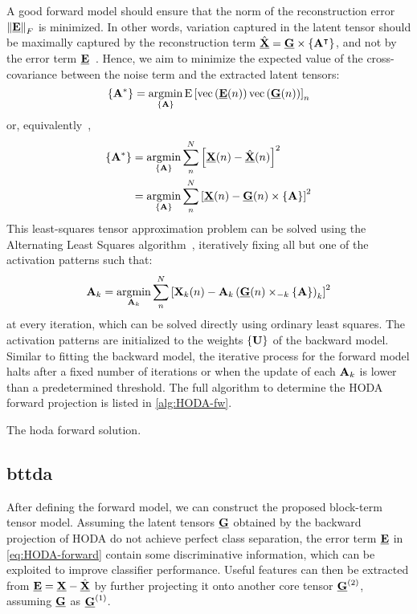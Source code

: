 \documentclass[twocolumn]{article}
\begin{document}
A good forward model should ensure that the norm of the reconstruction error
$\left\|\ten{E}\right\|_F$ is minimized.
In other words, variation captured in the latent tensor should be maximally captured by the
reconstruction term $\hat{\ten{X}}= \ten{G}\mmpr{\mat{A}^\intercal}$, and not by the error term
$\ten{E}$~\cite{Haufe2014}.
Hence, we aim to minimize the expected value of the cross-covariance between
the noise term and the extracted latent tensors:
\begin{equation}
	\left\{\mat{A}^*\right\}
	= \argmin_{\{\mat{A}\}}\text{E}\left[
		\text{vec}\left(\ten{E}(n)\right)\text{vec}\left(\ten{G}(n)\right)
		\right]_n
\end{equation}
or, equivalently~\cite{Parra2005,Haufe2014},
\begin{align}
	\left\{\mat{A}^*\right\}
	 & = \argmin_{\{\mat{A}\}}\sum_n^N\left[\ten{X}(n) -
	\hat{\ten{X}}(n)\right]^2                                                              \\
	 & = \argmin_{\{\mat{A}\}}\sum_n^N\left[\ten{X}(n) - \ten{G}(n)\mmpr{\mat{A}}\right]^2
\end{align}
This least-squares tensor approximation problem can be solved using the
Alternating Least Squares algorithm~\cite{Bentbib2022}, iteratively fixing all
but one of the activation patterns such that:
\begin{equation}
	\mat{A}_k = \argmin_{\mat{A}_k}
	\sum_n^N\left[\mat{X}_k(n) -
		\mat{A}_k\left(\ten{G}(n)\mmprs{\mat{A}}{k}\right)_k\right]^2
\end{equation}
at every iteration, which can be solved directly using ordinary least squares.
The activation patterns are initialized to the weights $\{\mat{U}\}$ of the
backward model.
Similar to fitting the backward model, the iterative process for the forward
model halts after a fixed number of iterations or when the update of each
$\mat{A}_k$ is lower than a predetermined threshold.
The full algorithm to determine the HODA forward projection is listed
in \cref{alg:HODA-fw}.
\begin{algorithm}
	\caption[A \acs{hoda} forward solution.]{The \acs{hoda} forward solution.}
	\label{alg:HODA-fw}
	
\end{algorithm}

\subsection{\Acl{bttda}}
After defining the forward model, we can construct the proposed block-term
tensor model.
Assuming the latent tensors $\ten{G}$ obtained by the backward projection of
HODA do not achieve perfect
class separation, the error term $\ten{E}$ in \cref{eq:HODA-forward} contain
some discriminative information, which can be exploited to improve classifier
performance.
Useful features can then be extracted from $\ten{E} = \ten{X} -
	\hat{\ten{X}}$ by further projecting it onto another core tensor
$\ten{G}^{(2)}$, assuming $\ten{G}$ as $\ten{G}^{(1)}$.
\end{document}
